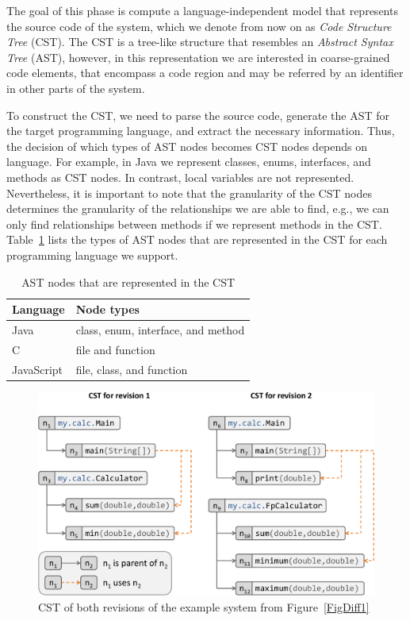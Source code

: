 The goal of this phase is compute a language-independent model that represents the source code of the system, which we denote from now on as \emph{Code Structure Tree} (CST). The CST is a tree-like structure that resembles an \emph{Abstract Syntax Tree} (AST), however, in this representation we are interested in coarse-grained code elements, that encompass a code region and may be referred by an identifier in other parts of the system.

To construct the CST, we need to parse the source code, generate the AST for the target programming language, and extract the necessary information.
Thus, the decision of which types of AST nodes becomes CST nodes depends on language.
For example, in Java we represent classes, enums, interfaces, and methods as CST nodes.
In contrast, local variables are not represented.
Nevertheless, it is important to note that the granularity of the CST nodes determines the granularity of the relationships we are able to find, e.g., we can only find relationships between methods if we represent methods in the CST.
Table~\ref{TabCstNodes} lists the types of AST nodes that are represented in the CST for each programming language we support.

\begin{table}[htbp]
\renewcommand{\arraystretch}{1.2}
\caption{AST nodes that are represented in the CST}
\label{TabCstNodes}
\centering
\begin{tabular}{@{}ll@{}}
\toprule
Language & Node types \\
\midrule
Java & class, enum, interface, and method \\
C & file and function \\
JavaScript & file, class, and function \\
\bottomrule
\end{tabular}
\end{table}

\begin{figure}[htb]
\centering
\includegraphics[width=1.0\linewidth]{img/cstDiff1.pdf}
\caption{CST of both revisions of the example system from Figure~\ref{FigDiff1}}
\label{FigJavaToCst}
\end{figure}

